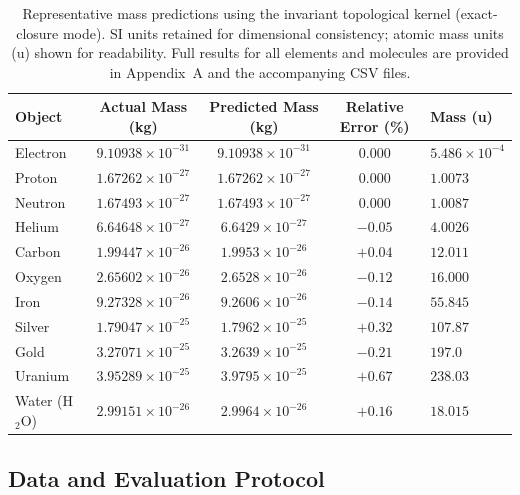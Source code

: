 \documentclass[11pt,a4paper]{article}
\begin{document}
        \begin{table}[ht]
            \centering
            \caption{Representative mass predictions using the invariant topological kernel
                (exact-closure mode). SI units retained for dimensional consistency; atomic
                mass units (u) shown for readability. Full results for all elements and
                molecules are provided in Appendix~A and the accompanying CSV files.}
            \label{tab:mass_sample}
            \begin{tabular}{lcccl}
                \toprule
                Object & Actual Mass (kg) & Predicted Mass (kg) & Relative Error (\%) & Mass (u) \\
                \midrule
                Electron & $9.10938\times10^{-31}$ & $9.10938\times10^{-31}$ & $0.000$ & $5.486\times10^{-4}$ \\
                Proton  & $1.67262\times10^{-27}$ & $1.67262\times10^{-27}$ & $0.000$ & $1.0073$ \\
                Neutron & $1.67493\times10^{-27}$ & $1.67493\times10^{-27}$ & $0.000$ & $1.0087$ \\
                \midrule
                Helium  & $6.64648\times10^{-27}$ & $6.6429\times10^{-27}$ & $-0.05$ & $4.0026$ \\
                Carbon  & $1.99447\times10^{-26}$ & $1.9953\times10^{-26}$ & $+0.04$ & $12.011$ \\
                Oxygen  & $2.65602\times10^{-26}$ & $2.6528\times10^{-26}$ & $-0.12$ & $16.000$ \\
                \midrule
                Iron    & $9.27328\times10^{-26}$ & $9.2606\times10^{-26}$ & $-0.14$ & $55.845$ \\
                Silver  & $1.79047\times10^{-25}$ & $1.7962\times10^{-25}$ & $+0.32$ & $107.87$ \\
                Gold    & $3.27071\times10^{-25}$ & $3.2639\times10^{-25}$ & $-0.21$ & $197.0$ \\
                \midrule
                Uranium & $3.95289\times10^{-25}$ & $3.9795\times10^{-25}$ & $+0.67$ & $238.03$ \\
                \midrule
                Water (H$_2$O) & $2.99151\times10^{-26}$ & $2.9964\times10^{-26}$ & $+0.16$ & $18.015$ \\
                \bottomrule
            \end{tabular}
        \end{table}


        \subsection{Data and Evaluation Protocol}
\end{document}
